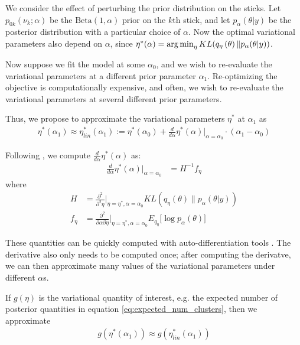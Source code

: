 
We consider the effect of perturbing the prior distribution on the sticks. Let
$p_{0k}(\nu_k; \alpha)$ be the $\text{Beta}(1, \alpha)$ prior on the $k$th
stick, and let $p_{\alpha}(\theta | y)$ be the posterior distribution with a
particular choice of $\alpha$. Now the optimal variational parameters also
depend on $\alpha$, since $\eta^*(\alpha) = \operatorname*{arg\,min}_\eta
KL(q_\eta\left(\theta\right) \| p_{\alpha}(\theta | y))$.

Now suppose we fit the model at some $\alpha_0$, and we wish to re-evaluate the
variational parameters at a different prior parameter $\alpha_1$. Re-optimizing
the objective is computationally expensive, and often, we wish to re-evaluate
the variational parameters at several different prior parameters.

Thus, we propose to approximate the variational parameters $\eta^*$ at
$\alpha_1$ as
%
\begin{align}
    \eta^*(\alpha_1) \approx \eta^*_{lin}(\alpha_1)
    := \eta^*(\alpha_0) +
    \frac{d}{d\alpha}\eta^*(\alpha)\Big|_{\alpha=\alpha_0} \cdot (\alpha_1 - \alpha_0)
    \label{eq:our_approximation}
\end{align}

Following \citet{giordano:2017:covariances},  we compute
$\frac{d}{d\alpha}\eta^*(\alpha) $ as:
%
\begin{align}
  \frac{d}{d\alpha}\eta^*(\alpha)\Big|_{\alpha=\alpha_0} &= H^{-1} f_\eta \label{eq:vb_sensitivty}
\end{align}
%
where
%
\begin{align}
  H &= \frac{\partial^2}{\partial^2\eta}\Big\rvert_{\eta = \eta^*, \alpha = \alpha_0}
  KL(q_\eta\left(\theta\right) \| p_\alpha(\theta | y)) \\
  f_\eta &= \frac{\partial^2}{\partial \alpha \partial \eta}
    \Big\rvert_{\eta = \eta^*, \alpha = \alpha_0} E_{q_{\eta}}
    \big[\log p_\alpha(\theta)\big]
\end{align}

These quantities can be quickly computed with auto-differentiation tools
\citep{maclaurin:2015:autograd}. The derivative also only needs to be computed
once; after computing the derivatve, we can then approximate many values of the
variational parameters under different $\alpha$s.

If $g(\eta)$ is the variational quantity of interest, e.g. the expected number
of posterior quantities in equation \ref{eq:expected_num_clusters}, then we
approximate
%
\begin{align}
    g(\eta^*(\alpha_1)) \approx g(\eta^*_{lin}(\alpha_1))
\end{align}

